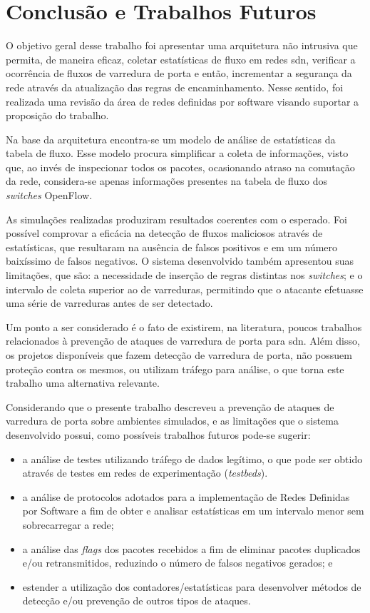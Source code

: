 \chapter{Conclusão e Trabalhos Futuros}
\label{cap:consideracoes}

O objetivo geral desse trabalho foi apresentar uma arquitetura não intrusiva que permita, de maneira eficaz, coletar estatísticas de fluxo em redes \gls{sdn}, verificar a ocorrência de fluxos de varredura de porta e então, incrementar a segurança da rede através da atualização das regras de encaminhamento. Nesse sentido, foi realizada uma revisão da área de redes definidas por software visando suportar a proposição do trabalho.

Na base da arquitetura encontra-se um modelo de análise de estatísticas da tabela de fluxo. Esse modelo procura simplificar a coleta de informações, visto que, ao invés de inspecionar todos os pacotes, ocasionando atraso na comutação da rede, considera-se apenas informações presentes na tabela de fluxo dos \textit{switches} OpenFlow.

As simulações realizadas produziram resultados coerentes com o esperado. Foi possível comprovar a eficácia na detecção de fluxos maliciosos através de estatísticas, que resultaram na ausência de falsos positivos e em um número baixíssimo de falsos negativos. O sistema desenvolvido também apresentou suas limitações, que são: a necessidade de inserção de regras distintas nos \textit{switches}; e o intervalo de coleta superior ao de varreduras, permitindo que o atacante efetuasse uma série de varreduras antes de ser detectado.

Um ponto a ser considerado é o fato de existirem, na literatura, poucos trabalhos relacionados à prevenção de ataques de varredura de porta para \gls{sdn}. Além disso, os projetos disponíveis que fazem detecção de varredura de porta, não possuem proteção contra os mesmos, ou utilizam tráfego para análise, o que torna este trabalho uma alternativa relevante.

Considerando que o presente trabalho descreveu a prevenção de ataques de varredura de porta sobre ambientes simulados, e as limitações que o sistema desenvolvido possui, como possíveis trabalhos futuros pode-se sugerir:
\begin{itemize}
    \item a análise de testes utilizando tráfego de dados legítimo, o que pode ser obtido através de testes em redes de experimentação (\textit{testbeds}).
    \item a análise de protocolos adotados para a implementação de Redes Definidas por Software a fim de obter e analisar estatísticas em um intervalo menor sem sobrecarregar a rede;
    \item a análise das \textit{flags} dos pacotes recebidos a fim de eliminar pacotes duplicados e/ou retransmitidos, reduzindo o número de falsos negativos gerados; e
    \item estender a utilização dos contadores/estatísticas para desenvolver métodos de detecção e/ou prevenção de outros tipos de ataques.
\end{itemize}